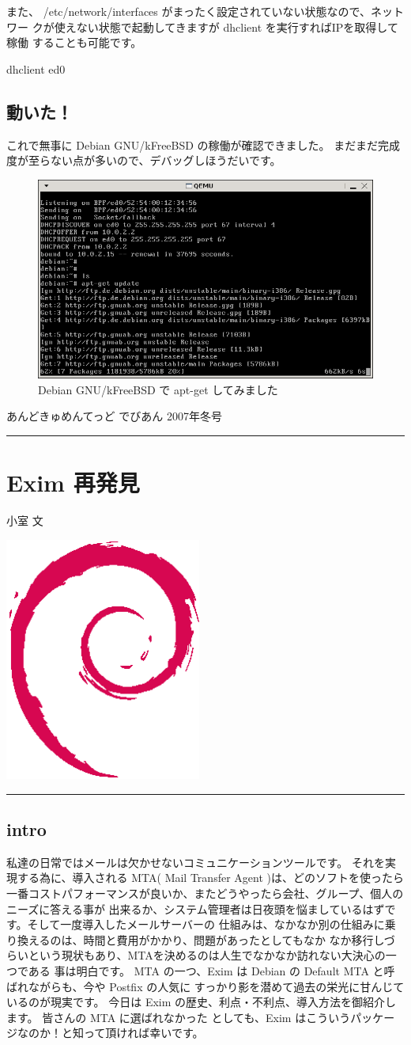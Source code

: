 \documentclass[mingoth,a4paper]{jsarticle}
\renewcommand{\dancersection}[2]{%
\newpage
あんどきゅめんてっど でびあん 2007年冬号
%
\vspace{0.1mm}\\
{\color{dancerlightblue}\rule{\hsize}{2mm}}

%
%
\begin{minipage}[t]{0.7\hsize}
\color{dancerdarkblue}
\vspace{1cm}
\section{#1}
\hfill{}#2\\
\end{minipage}
\begin{minipage}[t]{0.3\hsize}
\vspace{-2cm}
\hfill{}\includegraphics[height=8cm]{image200502/openlogo-nd.eps}\\
\vspace{-5cm}
\end{minipage}
%
%
{\color{dancerdarkblue}\rule{0.74\hsize}{2mm}}
%
\vspace{2cm}
}
\begin{document}
また、 /etc/network/interfaces がまったく設定されていない状態なので、ネットワー
クが使えない状態で起動してきますが dhclient を実行すればIPを取得して稼働
することも可能です。

\begin{commandline}
 dhclient ed0
\end{commandline}

\subsection{動いた！}

これで無事に Debian GNU/kFreeBSD の稼働が確認できました。
まだまだ完成度が至らない点が多いので、デバッグしほうだいです。

 \begin{figure}[H]
  \begin{center}
   \includegraphics[width=0.5\hsize]{image200708/kfreebsd-install-5.png}
  \end{center}
  \caption{Debian GNU/kFreeBSD で apt-get してみました}
  \label{fig:kfreebsdaptget}
 \end{figure}
 
\dancersection{Exim 再発見}{小室 文}
\label{debianexim}
\subsection{intro}
私達の日常ではメールは欠かせないコミュニケーションツールです。
それを実現する為に、導入される MTA( Mail Transfer Agent )は、どのソフトを使ったら
一番コストパフォーマンスが良いか、またどうやったら会社、グループ、個人のニーズに答える事が
出来るか、システム管理者は日夜頭を悩ましているはずです。そして一度導入したメールサーバーの
仕組みは、なかなか別の仕組みに乗り換えるのは、時間と費用がかかり、問題があったとしてもなか
なか移行しづらいという現状もあり、MTAを決めるのは人生でなかなか訪れない大決心の一つである
事は明白です。
MTA の一つ、Exim は Debian の Default MTA と呼ばれながらも、今や Postfix の人気に
すっかり影を潜めて過去の栄光に甘んじているのが現実です。
今日は Exim の歴史、利点・不利点、導入方法を御紹介します。 皆さんの MTA に選ばれなかった
としても、Exim はこういうパッケージなのか！と知って頂ければ幸いです。
\end{document}
